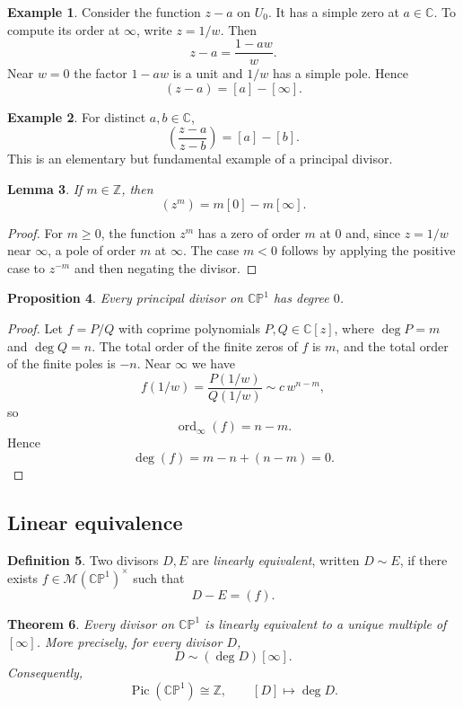\documentclass[11pt]{article}
\newcommand{\C}{\mathbb{C}}
\newcommand{\Z}{\mathbb{Z}}
\newcommand{\CP}{\mathbb{CP}}
\newcommand{\MM}{\mathcal{M}}
\newcommand{\Pic}{\operatorname{Pic}}
\newcommand{\ord}{\operatorname{ord}}
\newcommand{\degd}{\operatorname{deg}}
\newcommand{\CPone}{\CP^1}
\theoremstyle{plain}
\newtheorem{theorem}{Theorem}[section]
\newtheorem{proposition}[theorem]{Proposition}
\newtheorem{lemma}[theorem]{Lemma}
\theoremstyle{definition}
\newtheorem{definition}[theorem]{Definition}
\newtheorem{example}[theorem]{Example}
\begin{document}
\begin{example}
Consider the function $z-a$ on $U_0$. It has a simple zero at $a\in\C$. To compute its order at $\infty$, write $z=1/w$. Then
\[
z-a=\frac{1-aw}{w}.
\]
Near $w=0$ the factor $1-aw$ is a unit and $1/w$ has a simple pole. Hence
\[
(z-a)=[a]-[\infty].
\]
\end{example}

\begin{example}
For distinct $a,b\in\C$,
\[
\left(\frac{z-a}{z-b}\right)=[a]-[b].
\]
This is an elementary but fundamental example of a principal divisor.
\end{example}

\begin{lemma}
If $m\in\Z$, then
\[
(z^m)=m[0]-m[\infty].
\]
\end{lemma}

\begin{proof}
For $m\ge 0$, the function $z^m$ has a zero of order $m$ at $0$ and, since $z=1/w$ near $\infty$, a pole of order $m$ at $\infty$. The case $m<0$ follows by applying the positive case to $z^{-m}$ and then negating the divisor.
\end{proof}

\begin{proposition}
Every principal divisor on $\CPone$ has degree $0$.
\end{proposition}

\begin{proof}
Let $f=P/Q$ with coprime polynomials $P,Q\in\C[z]$, where $\deg P=m$ and $\deg Q=n$. The total order of the finite zeros of $f$ is $m$, and the total order of the finite poles is $-n$. Near $\infty$ we have
\[
f(1/w)=\frac{P(1/w)}{Q(1/w)}\sim c\,w^{n-m},
\]
so
\[
\ord_{\infty}(f)=n-m.
\]
Hence
\[
\degd(f)=m-n+(n-m)=0.
\]
\end{proof}

\subsection{Linear equivalence}
\begin{definition}
Two divisors $D,E$ are \emph{linearly equivalent}, written $D\sim E$, if there exists $f\in\MM(\CPone)^\times$ such that
\[
D-E=(f).
\]
\end{definition}

\begin{theorem}
Every divisor on $\CPone$ is linearly equivalent to a unique multiple of $[\infty]$. More precisely, for every divisor $D$,
\[
D\sim (\degd D)[\infty].
\]
Consequently,
\[
\Pic(\CPone)\cong \Z,
\qquad
[D]\longmapsto \degd D.
\]
\end{theorem}
\end{document}
